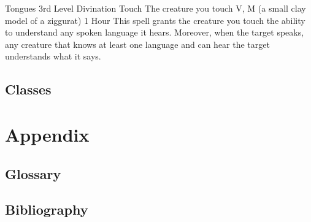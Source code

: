 \documentclass[10pt,twoside,twocolumn,openany,nomultitoc]{book}
\begin{document}
    \DndSpellHeader%
      {Tongues}
      {3rd Level Divination}
      {Touch}
      {The creature you touch}
      {V, M (a small clay model of a ziggurat)}
      {1 Hour}
    This spell grants the creature you touch the ability to understand any spoken language it hears. Moreover, when the target speaks, any creature that knows at least one language and can hear the target understands what it says.

            
\section{Classes}

\chapter{Appendix}
\section{Glossary}
\printglossaries


\section{Bibliography}
\begingroup
\let\clearpage\relax

    \nocite{*}

    \endgroup




\end{document}
